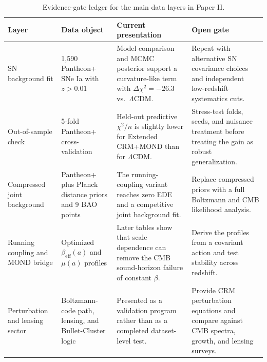 \documentclass[aps,prd,twocolumn,superscriptaddress,nofootinbib,floatfix]{revtex4-2}
\begin{document}
\begin{table}[t]
\centering
\caption{Evidence-gate ledger for the main data layers in Paper II.}
\label{tab:evidence_gate_ledger}
\footnotesize
\begin{tabular}{@{}llll@{}}
\toprule
\parbox[t]{0.17\textwidth}{\raggedright \textbf{Layer}} & \parbox[t]{0.21\textwidth}{\raggedright \textbf{Data object}} & \parbox[t]{0.26\textwidth}{\raggedright \textbf{Current presentation}} & \parbox[t]{0.24\textwidth}{\raggedright \textbf{Open gate}} \\
\midrule
\parbox[t]{0.17\textwidth}{\raggedright SN background fit} & \parbox[t]{0.21\textwidth}{\raggedright 1,590 Pantheon+ SNe Ia with $z>0.01$} & \parbox[t]{0.26\textwidth}{\raggedright Model comparison and MCMC posterior support a curvature-like term with $\Delta\chi^2=-26.3$ vs.\ $\Lambda$CDM.} & \parbox[t]{0.24\textwidth}{\raggedright Repeat with alternative SN covariance choices and independent low-redshift systematics cuts.} \\
\parbox[t]{0.17\textwidth}{\raggedright Out-of-sample check} & \parbox[t]{0.21\textwidth}{\raggedright 5-fold Pantheon+ cross-validation} & \parbox[t]{0.26\textwidth}{\raggedright Held-out predictive $\chi^2/n$ is slightly lower for Extended CRM+MOND than for $\Lambda$CDM.} & \parbox[t]{0.24\textwidth}{\raggedright Stress-test folds, seeds, and nuisance treatment before treating the gain as robust generalization.} \\
\parbox[t]{0.17\textwidth}{\raggedright Compressed joint background} & \parbox[t]{0.21\textwidth}{\raggedright Pantheon+ plus Planck distance priors and 9 BAO points} & \parbox[t]{0.26\textwidth}{\raggedright The running-coupling variant reaches zero EDE and a competitive joint background fit.} & \parbox[t]{0.24\textwidth}{\raggedright Replace compressed priors with a full Boltzmann and CMB likelihood analysis.} \\
\parbox[t]{0.17\textwidth}{\raggedright Running coupling and MOND bridge} & \parbox[t]{0.21\textwidth}{\raggedright Optimized $\beta_{\mathrm{eff}}(a)$ and $\mu(a)$ profiles} & \parbox[t]{0.26\textwidth}{\raggedright Later tables show that scale dependence can remove the CMB sound-horizon failure of constant $\beta$.} & \parbox[t]{0.24\textwidth}{\raggedright Derive the profiles from a covariant action and test stability across redshift.} \\
\parbox[t]{0.17\textwidth}{\raggedright Perturbation and lensing sector} & \parbox[t]{0.21\textwidth}{\raggedright Boltzmann-code path, lensing, and Bullet-Cluster logic} & \parbox[t]{0.26\textwidth}{\raggedright Presented as a validation program rather than as a completed dataset-level test.} & \parbox[t]{0.24\textwidth}{\raggedright Provide CRM perturbation equations and compare against CMB spectra, growth, and lensing surveys.} \\
\bottomrule
\end{tabular}
\end{table}
\end{document}
